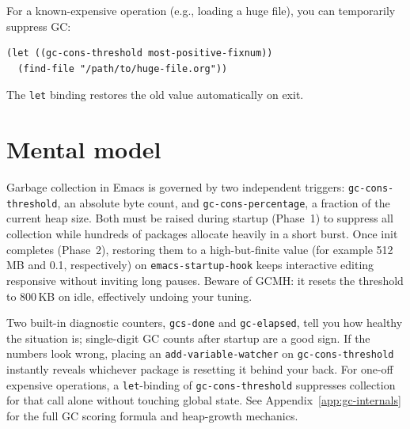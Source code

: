 For a known-expensive operation (e.g., loading a huge file), you can temporarily suppress GC:

\begin{verbatim}
(let ((gc-cons-threshold most-positive-fixnum))
  (find-file "/path/to/huge-file.org"))
\end{verbatim}

The \texttt{let} binding restores the old value automatically on exit.

\section{Mental model}
Garbage collection in Emacs is governed by two independent triggers:
\texttt{gc-cons-threshold}, an absolute byte count, and
\texttt{gc-cons-percentage}, a fraction of the current heap size.  Both
must be raised during startup (Phase~1) to suppress all collection while
hundreds of packages allocate heavily in a short burst.  Once init
completes (Phase~2), restoring them to a high-but-finite value (for
example 512\,MB and 0.1, respectively) on \texttt{emacs-startup-hook}
keeps interactive editing responsive without inviting long pauses.
Beware of GCMH: it resets the threshold to 800\,KB on idle, effectively
undoing your tuning.

Two built-in diagnostic counters, \texttt{gcs-done} and
\texttt{gc-elapsed}, tell you how healthy the situation is;
single-digit GC counts after startup are a good sign.  If the numbers
look wrong, placing an \texttt{add-variable-watcher} on
\texttt{gc-cons-threshold} instantly reveals whichever package is
resetting it behind your back.  For one-off expensive operations,
a \texttt{let}-binding of \texttt{gc-cons-threshold} suppresses
collection for that call alone without touching global state.
See Appendix~\ref{app:gc-internals} for the full GC scoring formula
and heap-growth mechanics.

